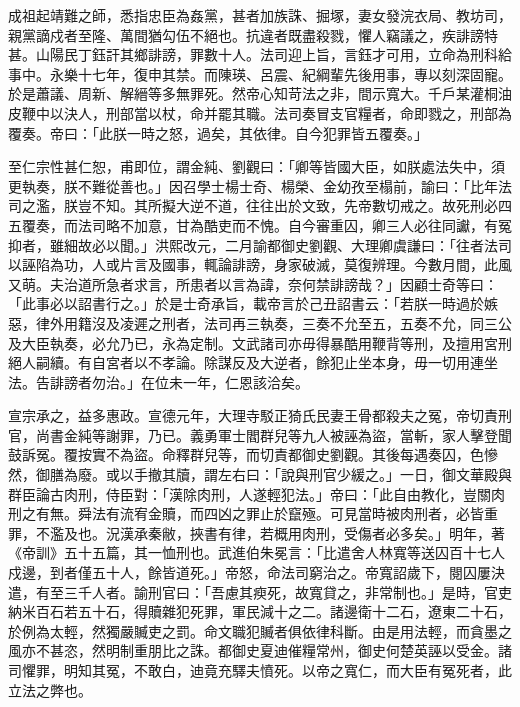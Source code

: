成祖起靖難之師，悉指忠臣為姦黨，甚者加族誅、掘塚，妻女發浣衣局、教坊司，親黨謫戍者至隆、萬間猶勾伍不絕也。抗違者既盡殺戮，懼人竊議之，疾誹謗特甚。山陽民丁鈺訐其鄉誹謗，罪數十人。法司迎上旨，言鈺才可用，立命為刑科給事中。永樂十七年，復申其禁。而陳瑛、呂震、紀綱輩先後用事，專以刻深固寵。於是蕭議、周新、解縉等多無罪死。然帝心知苛法之非，間示寬大。千戶某灌桐油皮鞭中以決人，刑部當以杖，命并罷其職。法司奏冒支官糧者，命即戮之，刑部為覆奏。帝曰：「此朕一時之怒，過矣，其依律。自今犯罪皆五覆奏。」

至仁宗性甚仁恕，甫即位，謂金純、劉觀曰：「卿等皆國大臣，如朕處法失中，須更執奏，朕不難從善也。」因召學士楊士奇、楊榮、金幼孜至榻前，諭曰：「比年法司之濫，朕豈不知。其所擬大逆不道，往往出於文致，先帝數切戒之。故死刑必四五覆奏，而法司略不加意，甘為酷吏而不愧。自今審重囚，卿三人必往同讞，有冤抑者，雖細故必以聞。」洪熙改元，二月諭都御史劉觀、大理卿虞謙曰：「往者法司以誣陷為功，人或片言及國事，輒論誹謗，身家破滅，莫復辨理。今數月間，此風又萌。夫治道所急者求言，所患者以言為諱，奈何禁誹謗哉？」因顧士奇等曰：「此事必以詔書行之。」於是士奇承旨，載帝言於己丑詔書云：「若朕一時過於嫉惡，律外用籍沒及凌遲之刑者，法司再三執奏，三奏不允至五，五奏不允，同三公及大臣執奏，必允乃已，永為定制。文武諸司亦毋得暴酷用鞭背等刑，及擅用宮刑絕人嗣續。有自宮者以不孝論。除謀反及大逆者，餘犯止坐本身，毋一切用連坐法。告誹謗者勿治。」在位未一年，仁恩該洽矣。

宣宗承之，益多惠政。宣德元年，大理寺駁正猗氏民妻王骨都殺夫之冤，帝切責刑官，尚書金純等謝罪，乃已。義勇軍士閻群兒等九人被誣為盜，當斬，家人擊登聞鼓訴冤。覆按實不為盜。命釋群兒等，而切責都御史劉觀。其後每遇奏囚，色慘然，御膳為廢。或以手撤其牘，謂左右曰：「說與刑官少緩之。」一日，御文華殿與群臣論古肉刑，侍臣對：「漢除肉刑，人遂輕犯法。」帝曰：「此自由教化，豈關肉刑之有無。舜法有流宥金贖，而四凶之罪止於竄殛。可見當時被肉刑者，必皆重罪，不濫及也。況漢承秦敝，挾書有律，若概用肉刑，受傷者必多矣。」明年，著《帝訓》五十五篇，其一恤刑也。武進伯朱冕言：「比遣舍人林寬等送囚百十七人戍邊，到者僅五十人，餘皆道死。」帝怒，命法司窮治之。帝寬詔歲下，閱囚屢決遣，有至三千人者。諭刑官曰：「吾慮其瘐死，故寬貸之，非常制也。」是時，官吏納米百石若五十石，得贖雜犯死罪，軍民減十之二。諸邊衛十二石，遼東二十石，於例為太輕，然獨嚴贓吏之罰。命文職犯贓者俱依律科斷。由是用法輕，而貪墨之風亦不甚恣，然明制重朋比之誅。都御史夏迪催糧常州，御史何楚英誣以受金。諸司懼罪，明知其冤，不敢白，迪竟充驛夫憤死。以帝之寬仁，而大臣有冤死者，此立法之弊也。

